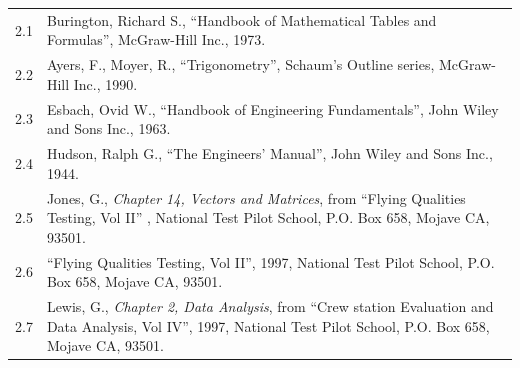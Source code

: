 \documentclass[
]{book}
\begin{document}
\begin{longtable}[]{@{}ll@{}}
\toprule
\endhead
\begin{minipage}[t]{0.06\columnwidth}\raggedright
2.1\strut
\end{minipage} & \begin{minipage}[t]{0.88\columnwidth}\raggedright
Burington, Richard S., ``Handbook of Mathematical Tables and Formulas'', McGraw-Hill Inc., 1973.\strut
\end{minipage}\tabularnewline
\begin{minipage}[t]{0.06\columnwidth}\raggedright
2.2\strut
\end{minipage} & \begin{minipage}[t]{0.88\columnwidth}\raggedright
Ayers, F., Moyer, R., ``Trigonometry'', Schaum's Outline series, McGraw-Hill Inc., 1990.\strut
\end{minipage}\tabularnewline
\begin{minipage}[t]{0.06\columnwidth}\raggedright
2.3\strut
\end{minipage} & \begin{minipage}[t]{0.88\columnwidth}\raggedright
Esbach, Ovid W., ``Handbook of Engineering Fundamentals'', John Wiley and Sons Inc., 1963.\strut
\end{minipage}\tabularnewline
\begin{minipage}[t]{0.06\columnwidth}\raggedright
2.4\strut
\end{minipage} & \begin{minipage}[t]{0.88\columnwidth}\raggedright
Hudson, Ralph G., ``The Engineers' Manual'', John Wiley and Sons Inc., 1944.\strut
\end{minipage}\tabularnewline
\begin{minipage}[t]{0.06\columnwidth}\raggedright
2.5\strut
\end{minipage} & \begin{minipage}[t]{0.88\columnwidth}\raggedright
Jones, G., \emph{Chapter 14, Vectors and Matrices}, from ``Flying Qualities Testing, Vol II'' , National Test Pilot School, P.O. Box 658, Mojave CA, 93501.\strut
\end{minipage}\tabularnewline
\begin{minipage}[t]{0.06\columnwidth}\raggedright
2.6\strut
\end{minipage} & \begin{minipage}[t]{0.88\columnwidth}\raggedright
``Flying Qualities Testing, Vol II'', 1997, National Test Pilot School, P.O. Box 658, Mojave CA, 93501.\strut
\end{minipage}\tabularnewline
\begin{minipage}[t]{0.06\columnwidth}\raggedright
2.7\strut
\end{minipage} & \begin{minipage}[t]{0.88\columnwidth}\raggedright
Lewis, G., \emph{Chapter 2, Data Analysis}, from ``Crew station Evaluation and Data Analysis, Vol IV'', 1997, National Test Pilot School, P.O. Box 658, Mojave CA, 93501.\strut
\end{minipage}\tabularnewline
\bottomrule
\end{longtable}
\end{document}

